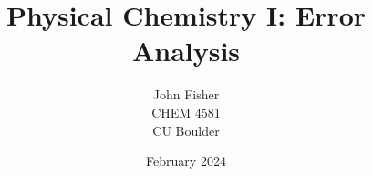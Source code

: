\documentclass{article}
\author{John Fisher \\ CHEM 4581 \\ CU Boulder}
\date{February 2024}
\begin{document}
\title{Physical Chemistry I: Error Analysis}
\maketitle

\end{document}

